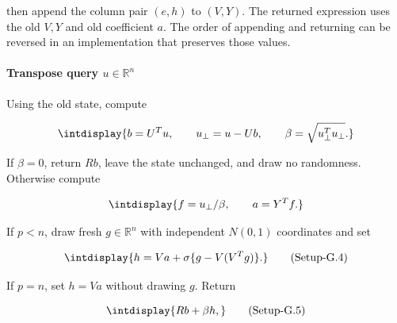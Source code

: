 
then append the column pair \((e,\allowbreak h)\) to \((V,\allowbreak Y)\). The returned expression uses the old \(V,\allowbreak Y\) and old coefficient \(a\). The order of appending and returning can be reversed in an implementation that preserves those values.


\paragraph{Transpose query \(u\in\mathbb R^n\)}

\mbox{}\par\smallskip


Using the old state, compute


\begingroup\renewcommand{\theHequation}{intdisplay.1056}
\begin{equation*}
\intdisplay{
b=U^T u,\qquad u_\perp=u-Ub,\qquad
 \beta=\sqrt{u_\perp^T u_\perp}.
}
\end{equation*}
\endgroup


If \(\beta=0\), return \(Rb\), leave the state unchanged, and draw no randomness. Otherwise compute


\begingroup\renewcommand{\theHequation}{intdisplay.1057}
\begin{equation*}
\intdisplay{
f=u_\perp/\beta,\qquad a=Y^T f.
}
\end{equation*}
\endgroup


If \(p<n\), draw fresh \(g\in\mathbb R^n\) with independent \(N(0,\allowbreak 1)\) coordinates and set


\label{int:eq-setup-g-4}
\begingroup\renewcommand{\theHequation}{intdisplay.1058}
\begin{equation}
\intdisplay{
h=Va+\sigma\{g-V(V^Tg)\}.
}
\tag{Setup-G.4}
\label{int:eq-0558-setup-g-4}
\end{equation}
\endgroup


If \(p=n\), set \(h=Va\) without drawing \(g\). Return


\label{int:eq-setup-g-5}
\begingroup\renewcommand{\theHequation}{intdisplay.1059}
\begin{equation}
\intdisplay{
Rb+\beta h,
}
\tag{Setup-G.5}
\label{int:eq-0559-setup-g-5}
\end{equation}
\endgroup

